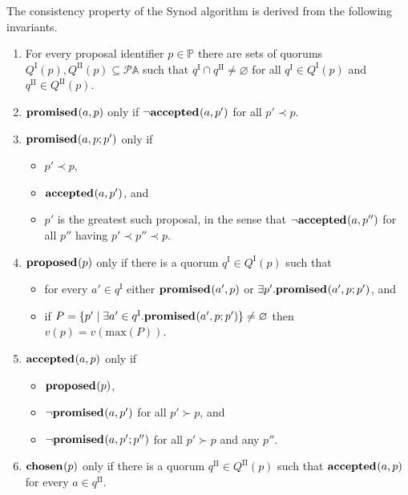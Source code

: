 \documentclass[journal]{IEEEtran}
\begin{document}
The consistency property of the Synod algorithm is derived from the following
invariants.

\begin{enumerate}

\item \label{synod-quorums} For every proposal identifier $p \in \mathbb P$
there are sets of quorums $Q^\textrm{I}(p), Q^\textrm{II}(p) \subseteq \mathcal
P \mathbb A$ such that $q^\textrm{I} \cap q^\textrm{II} \ne \varnothing$ for
all $q^\textrm{I} \in Q^\textrm{I}(p)$ and $q^\textrm{II} \in
Q^\textrm{II}(p)$.

\item \label{synod-fprom} $\mathbf{promised}_{}(a,p)$ only if $\neg\mathbf{accepted}_{}(a,p')$ for all
$p' \prec p$.

\item \label{synod-bprom} $\mathbf{promised}_{}(a,p;p')$ only if
\begin{itemize}
\item $p' \prec p$,
\item $\mathbf{accepted}_{}(a,p')$, and
\item $p'$ is the greatest such proposal, in the sense that
$\neg\mathbf{accepted}_{}(a,p'')$ for all $p''$ having $p' \prec p'' \prec p$.
\end{itemize}

\item \label{synod-prop} $\mathbf{proposed}_{}(p)$ only if there is a quorum $q^\textrm{I}
\in Q^\textrm{I}(p)$ such that
\begin{itemize}
\item for every $a' \in q^\textrm{I}$ either $\mathbf{promised}_{}(a',p)$ or $\exists p'.
\mathbf{promised}_{}(a',p;p')$, and
\item if $P = \{ p' \mid \exists a' \in q^\textrm{I}. \mathbf{promised}_{}(a',p;p') \}
\ne \varnothing$ then $v(p) = v(\mathrm{max}(P))$.
\end{itemize}

\item \label{synod-acc} $\mathbf{accepted}_{}(a,p)$ only if
\begin{itemize}
\item $\mathbf{proposed}_{}(p)$,
\item $\neg\mathbf{promised}_{}(a,p')$ for all $p' \succ p$, and
\item $\neg\mathbf{promised}_{}(a,p';p'')$ for all $p' \succ p$ and any $p''$.
\end{itemize}

\item \label{synod-chosen} $\mathbf{chosen}_{}(p)$ only if there is a quorum
$q^\textrm{II} \in Q^\textrm{II}(p)$ such that $\mathbf{accepted}_{}(a,p)$ for every $a \in
q^\textrm{II}$.

\end{enumerate}
\end{document}
